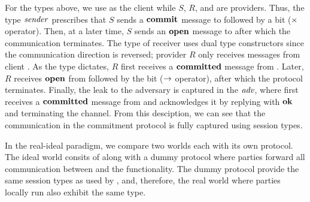 For the types above, we use \Fcom as the client while $S$, $R$, and \A are providers.
Thus, the type $\relax{\it sender}$ prescribes that $S$ sends a $\mathbf{commit}$ message to \Fcom
followed by a bit ($\times$ operator).
Then, at a later time, $S$ sends an $\mathbf{open}$ message to \Fcom after which the communication terminates.
The type of receiver uses dual type constructors since the communication direction is reversed;
provider $R$ only receives messages from client \Fcom.
As the type dictates, $R$ first receives a $\mathbf{committed}$ message from \Fcom.
Later, $R$ receives $\mathbf{open}$ from \Fcom followed by the bit ($\rightarrow$ operator), after
which the protocol terminates.
Finally, the leak to the adversary is captured in the $\relax{\it adv}$, where \A first receives
a $\mathbf{committed}$ message from \Fcom and acknowledges it by replying with $\mathbf{ok}$
and terminating the channel.
From this desciption, we can see that the communication in the commitment protocol is fully captured
using session types.


In the real-ideal paradigm, we compare two worlds each with its own protocol.
The ideal world consits of \Fcom along with a dummy protocol where parties forward all
communication between \Z and the functionality.
The dummy protocol provide the same session types as used by \Fcom, and, therefore, the real
world where parties locally run \protcom also exhibit the same type.

%

